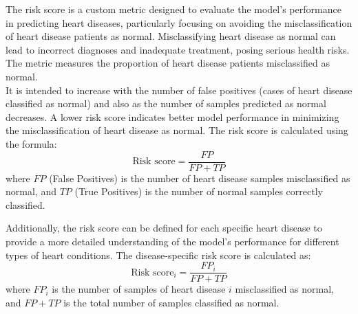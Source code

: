 The risk score is a custom metric designed to evaluate the model's performance in predicting heart diseases,
particularly focusing on avoiding the misclassification of heart disease patients as normal.
Misclassifying heart disease as normal can lead to incorrect diagnoses and inadequate treatment, posing serious health risks. \\
The metric measures the proportion of heart disease patients misclassified as normal.\\
It is intended to increase with the number of false positives (cases of heart disease classified as normal)
and also as the number of samples predicted as normal decreases.
A lower risk score indicates better model performance in minimizing the misclassification of heart disease as normal.
The risk score is calculated using the formula:
\[
    \text{Risk score} = \frac{FP}{FP + TP}
\]
where \(FP\) (False Positives) is the number of heart disease samples misclassified as normal, and \(TP\) (True Positives)
 is the number of normal samples correctly classified.

Additionally, the risk score can be defined for each specific heart disease to provide a more detailed understanding 
of the model's performance for different types of heart conditions. The disease-specific risk score is calculated as:
\[
    \text{Risk score}_i = \frac{FP_i}{FP + TP}
\]
where \(FP_i\) is the number of samples of heart disease \(i\) misclassified as normal, and \(FP + TP\) is the total number of samples classified as normal.